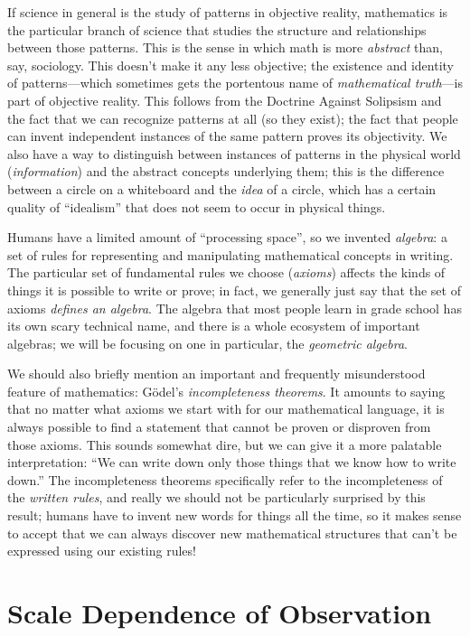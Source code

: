If science in general is the study of patterns in objective reality, mathematics is the particular branch of science that studies the structure and relationships between those patterns. This is the sense in which math is more \emph{abstract} than, say, sociology. This doesn't make it any less objective; the existence and identity of patterns---which sometimes gets the portentous name of \emph{mathematical truth}---is part of objective reality. This follows from the Doctrine Against Solipsism and the fact that we can recognize patterns at all (so they exist); the fact that people can invent independent instances of the same pattern proves its objectivity. We also have a way to distinguish between instances of patterns in the physical world (\emph{information}) and the abstract concepts underlying them; this is the difference between a circle on a whiteboard and the \emph{idea} of a circle, which has a certain quality of ``idealism'' that does not seem to occur in physical things.

Humans have a limited amount of ``processing space'', so we invented \emph{algebra}: a set of rules for representing and manipulating mathematical concepts in writing. The particular set of fundamental rules we choose (\emph{axioms}) affects the kinds of things it is possible to write or prove; in fact, we generally just say that the set of axioms \emph{defines an algebra}. The algebra that most people learn in grade school has its own scary technical name, and there is a whole ecosystem of important algebras; we will be focusing on one in particular, the \emph{geometric algebra}.

We should also briefly mention an important and frequently misunderstood feature of mathematics: G\"odel's \emph{incompleteness theorems}. It amounts to saying that no matter what axioms we start with for our mathematical language, it is always possible to find a statement that cannot be proven or disproven from those axioms. This sounds somewhat dire, but we can give it a more palatable interpretation: ``We can write down only those things that we know how to write down.'' The incompleteness theorems specifically refer to the incompleteness of the \emph{written rules}, and really we should not be particularly surprised by this result; humans have to invent new words for things all the time, so it makes sense to accept that we can always discover new mathematical structures that can't be expressed using our existing rules!

\section{Scale Dependence of Observation}

